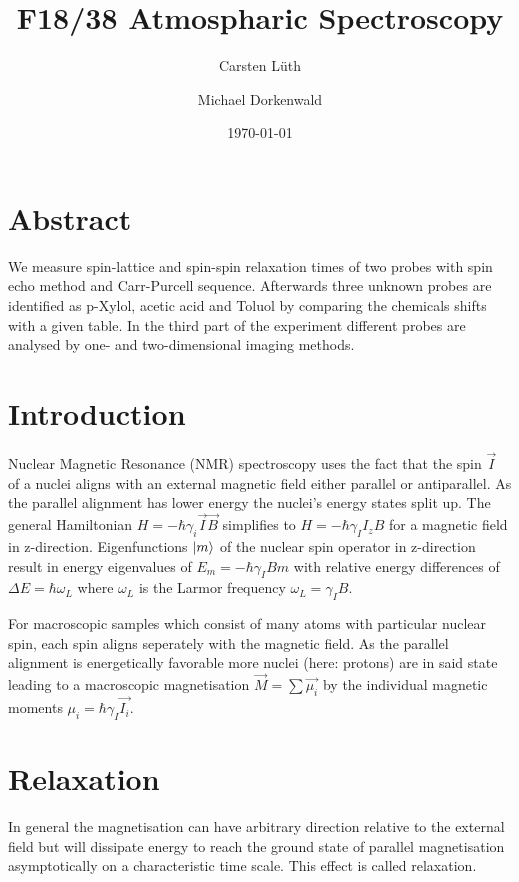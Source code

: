 \documentclass[12pt, english]{scrartcl} %
\title{F18/38 Atmospharic Spectroscopy}
\author{Carsten L{\"u}th \and Michael Dorkenwald}
\date{\today}
\begin{document}
\maketitle

\begin{multicols}{2}


\section{Abstract}
We measure spin-lattice and spin-spin relaxation times of two probes with spin echo method and Carr-Purcell sequence. Afterwards three unknown probes are identified as p-Xylol, acetic acid and Toluol by comparing the chemicals shifts with a given table. In the third part of the experiment different probes are analysed by one- and two-dimensional imaging methods.
\section{Introduction}

Nuclear Magnetic Resonance (NMR) spectroscopy uses the fact that the spin $\vec{I}$ of a nuclei aligns with an external magnetic field either parallel or antiparallel. As the parallel alignment has lower energy the nuclei's energy states split up. The general Hamiltonian $H = -\hbar \gamma_i \vec{I} \vec{B}$ simplifies to $ H = - \hbar \gamma_I I_z B$ for a magnetic field in z-direction. Eigenfunctions $\ket{m}$ of the nuclear spin operator in z-direction result in energy eigenvalues of $E_m = - \hbar \gamma_I B m$ with relative energy differences of $ \Delta E = \hbar \omega_L $ where $\omega_L$ is the Larmor frequency $\omega_L = \gamma_I B$.

For macroscopic samples which consist of many atoms with particular nuclear spin, each spin aligns seperately with the magnetic field. As the parallel alignment is energetically favorable more nuclei (here: protons) are in said state leading to a macroscopic magnetisation $\vec{M} = \sum \vec{\mu_i} $ by the individual magnetic moments $\mu_i = \hbar \gamma_I \vec{I_i}$.


\section{Relaxation}

In general the magnetisation can have arbitrary direction relative to the external field but will dissipate energy to reach the ground state of parallel magnetisation asymptotically on a characteristic time scale. This effect is called relaxation.


\end{multicols}
\end{document}
